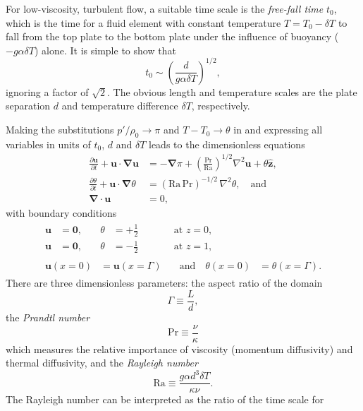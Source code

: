 \documentclass[titlepage]{article}
\numberwithin{equation}{section}
\newcommand{\pdiff}[2]{\frac{\partial #1}{\partial #2}}
\renewcommand\vec{\bm}
\newcommand{\uvec}[1]{\vec{\hat{#1}}}
\newcommand{\grad}{\vec{\nabla}}
\newcommand{\prandtl}{\ensuremath{\mathrm{Pr}}}
\newcommand{\rayleigh}{\ensuremath{\mathrm{Ra}}}
\begin{document}
For low-viscosity, turbulent flow, a suitable time scale is the
\emph{free-fall time} $t_0$, which is the time for a fluid element with
constant temperature $T = T_0 - \delta T$ to fall from the top plate to
the bottom plate under the influence of buoyancy ($-g \alpha \delta T$)
alone. It is simple to show that
\[
    t_0 \sim \left( \frac{d}{g \alpha \delta T} \right)^{1/2},
\]
ignoring a factor of $\sqrt{2}$. The obvious length and temperature
scales are the plate separation $d$ and temperature difference $\delta T$,
respectively.

Making the substitutions $p'/\rho_0 \to \pi$ and $T - T_0 \to \theta$
in  and expressing all
variables in units of $t_0$, $d$ and $\delta T$ leads to the dimensionless
equations
\begin{align}
    \label{eqn:momentum}
    \pdiff{\vec{u}}{t} + \vec{u} \cdot \grad \vec{u}
        &= -\grad \pi + \left( \frac{\prandtl}{\rayleigh}\right)^{1/2}
        \nabla^2 \vec{u} + \theta \uvec{z}, \\
    \label{eqn:energy}
    \pdiff{\theta}{t} + \vec{u} \cdot \grad \theta
        &= (\rayleigh\,\prandtl)^{-1/2} \, \nabla^2 \theta, \quad \text{and} \\
    \label{eqn:incompressible}
    \grad \cdot \vec{u} &= 0,
\end{align}
with boundary conditions
\begin{gather}
\begin{alignat}{3}
    \label{eqn:bc_bot}
    \vec{u} &= \vec{0}, &\quad \theta &= +\frac{1}{2}
    &\qquad& \text{at } z = 0, \\
    \label{eqn:bc_top}
    \vec{u} &= \vec{0}, &\quad \theta &= -\frac{1}{2}
    &\qquad& \text{at } z = 1,
\end{alignat} \\
\begin{alignat}{2}
    \label{eqn:bc_sides}
    \vec{u}(x=0) &= \vec{u}(x=\Gamma)
    &\quad \text{and} \quad \theta(x=0) &= \theta(x=\Gamma).
\end{alignat}
\end{gather}
There are three dimensionless parameters: the aspect ratio of the domain
\[
    \Gamma \equiv \frac{L}{d},
\]
the \emph{Prandtl number}
\[
    \prandtl \equiv \frac{\nu}{\kappa}
\]
which measures the relative importance of viscosity (momentum diffusivity)
and thermal diffusivity, and the \emph{Rayleigh number}
\[
    \rayleigh \equiv \frac{g \alpha d^3 \delta T}{\kappa \nu}.
\]
The Rayleigh number can be interpreted as the ratio of the time scale for
\end{document}
